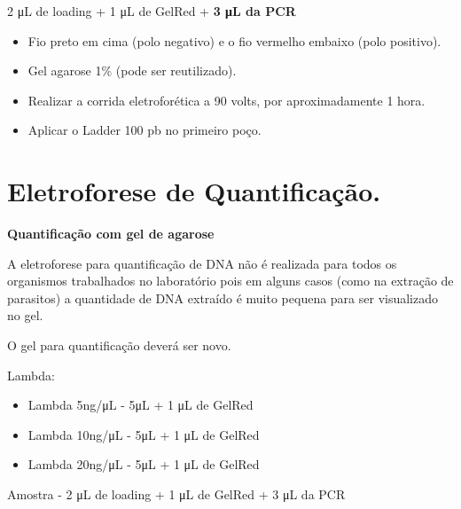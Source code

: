 \documentclass[
  letterpaper,
  DIV=11,
  numbers=noendperiod]{scrreprt}
\providecommand{\tightlist}{%
  \setlength{\itemsep}{0pt}\setlength{\parskip}{0pt}}\usepackage{longtable,booktabs,array}
\begin{document}
2 μL de loading + 1 μL de GelRed + \textbf{3 μL da PCR}

\begin{tcolorbox}[enhanced jigsaw, colbacktitle=quarto-callout-important-color!10!white, toprule=.15mm, rightrule=.15mm, opacityback=0, left=2mm, arc=.35mm, breakable, colback=white, bottomtitle=1mm, opacitybacktitle=0.6, toptitle=1mm, leftrule=.75mm, coltitle=black, titlerule=0mm, bottomrule=.15mm, title=\textcolor{quarto-callout-important-color}{\faExclamation}\hspace{0.5em}{Importante}]

\begin{itemize}
\tightlist
\item
  Fio preto em cima (polo negativo) e o fio vermelho embaixo (polo
  positivo).
\item
  Gel agarose 1\% (pode ser reutilizado).
\item
  Realizar a corrida eletroforética a 90 volts, por aproximadamente 1
  hora.
\item
  Aplicar o Ladder 100 pb no primeiro poço.
\end{itemize}

\end{tcolorbox}

\hypertarget{eletroforese-de-quantificauxe7uxe3o.}{%
\section{Eletroforese de
Quantificação.}\label{eletroforese-de-quantificauxe7uxe3o.}}

\textbf{Quantificação com gel de agarose}

A eletroforese para quantificação de DNA não é realizada para todos os
organismos trabalhados no laboratório pois em alguns casos (como na
extração de parasitos) a quantidade de DNA extraído é muito pequena para
ser visualizado no gel.

O gel para quantificação deverá ser novo.

Lambda:

\begin{itemize}
\item
  Lambda 5ng/μL - 5μL + 1 μL de GelRed
\item
  Lambda 10ng/μL - 5μL + 1 μL de GelRed
\item
  Lambda 20ng/μL - 5μL + 1 μL de GelRed
\end{itemize}

Amostra - 2 μL de loading + 1 μL de GelRed + 3 μL da PCR
\end{document}
